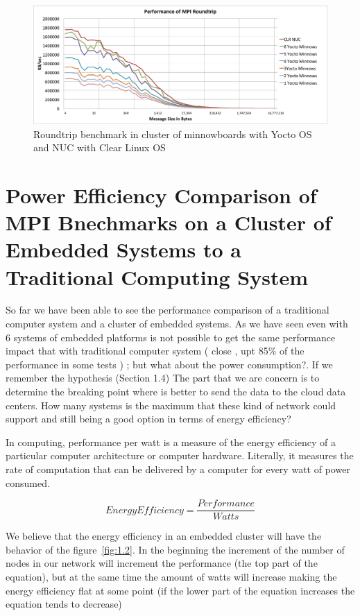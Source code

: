 \begin{figure}[H]
\centering
\includegraphics[width=1.0\textwidth]{images/mpbench_cluster_experiments/mpi_roundtrip.png}
\caption{Roundtrip  benchmark in cluster of minnowboards with Yocto OS and NUC
with Clear Linux OS}
\label{all_to_all_cluster}
\end{figure}


\section{Power Efficiency Comparison of MPI Bnechmarks on a Cluster of Embedded
Systems to a Traditional Computing System}

So far we have been able to see the performance comparison of a traditional
computer system and a cluster of embedded systems. As we have seen even with 6
systems of embedded platforms is not possible to get the same performance
impact that with traditional computer system ( close , upt 85\% of the
performance in some tests ) ; but what about the power consumption?. If we
remember the hypothesis (Section 1.4) The part that we are concern is to
determine the breaking point where is better to send the data to the cloud data
centers. How many systems is the maximum that these kind of network could
support and still being a good option in terms of energy efficiency?

In computing, performance per watt is a measure of the energy efficiency of a
particular computer architecture or computer hardware. Literally, it measures
the rate of computation that can be delivered by a computer for every watt of
power consumed.

\begin{equation}
    Energy Efficiency = \dfrac {Performance}{Watts}
\end{equation}

We believe that the energy efficiency in an embedded cluster will have the
behavior of the  figure~\ref{fig:1.2}. In the beginning the increment of the
number of nodes in our network will increment the performance (the top part of
the equation), but at the same time the amount of watts will
increase making the energy efficiency flat at some point (if the lower part of
the equation increases the equation tends to decrease)

